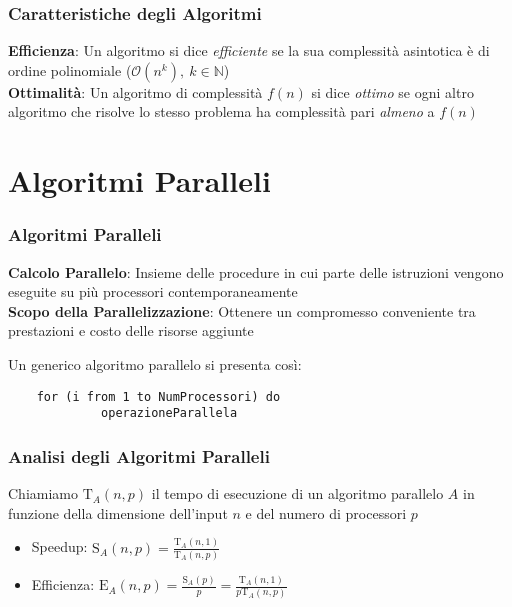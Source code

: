 \documentclass[14pt]{beamer}
\begin{document}

\begin{frame}
\frametitle{Caratteristiche degli Algoritmi}
\textbf{Efficienza}: Un algoritmo si dice \textit{efficiente} se la sua complessità asintotica è di ordine polinomiale ($\mathcal{O}(n^k), \ k \in \mathbb{N}$)\\
\textbf{Ottimalità}: Un algoritmo di complessità $f(n)$ si dice \textit{ottimo} se ogni altro algoritmo che risolve lo stesso problema ha complessità pari \textit{almeno} a $f(n)$
\end{frame}



\section{Algoritmi Paralleli}
\begin{frame}
\frametitle{Algoritmi Paralleli}
\textbf{Calcolo Parallelo}: Insieme delle procedure in cui parte delle istruzioni vengono eseguite su più processori contemporaneamente\\
\textbf{Scopo della Parallelizzazione}: Ottenere un compromesso conveniente tra prestazioni e costo delle risorse aggiunte
\end{frame}


\begin{frame}[fragile]
Un generico algoritmo parallelo si presenta così:\\
\begin{verbatim}
    for (i from 1 to NumProcessori) do
             operazioneParallela
\end{verbatim}
\end{frame}


\begin{frame}
\frametitle{Analisi degli Algoritmi Paralleli}
Chiamiamo $\mathrm{T}_{A}(n, p)$ il tempo di esecuzione di un algoritmo parallelo $A$ in funzione della dimensione dell'input $n$ e del numero di processori $p$\\
\begin{itemize}
\item{Speedup}: $\displaystyle \mathrm{S}_{A}(n, p) = \frac{\mathrm{T}_{A}(n, 1)}{\mathrm{T}_{A}(n, p)}$\\
\item{Efficienza}: $\displaystyle \mathrm{E}_{A}(n, p) = \frac{\mathrm{S}_{A}(p)}{p} = \frac{\mathrm{T}_{A}(n, 1)}{p\mathrm{T}_{A}(n, p)}$
\end{itemize}
\end{frame}
\end{document}
